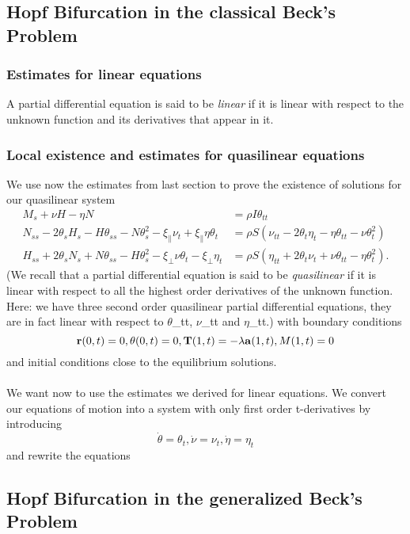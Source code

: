 
\subsection{Hopf Bifurcation in the classical Beck's Problem}
\subsubsection{Estimates for linear equations}
A partial differential equation is said to be \emph{linear} if it is linear with respect to the unknown function and its derivatives that appear in it.
\subsubsection{Local existence and estimates for quasilinear equations}
We use now the estimates from last section to prove the existence of solutions for our quasilinear system
\[
\begin{align}
M_s + \nu H -\eta N 
&= \rho I \theta_{tt}\\
N_{ss} - 2\theta_sH_s - H\theta_{ss}- N\theta_s^2 
- \xi_{\parallel}\nu_t + \xi_{\parallel}\eta\theta_t
&= \rho S (\nu_{tt} - 2 \theta_t\eta_t - \eta\theta_{tt} - \nu\theta_t^2)\\
H_{ss} + 2\theta_sN_s + N\theta_{ss} - H\theta_s^2 
- \xi_{\perp}\nu\theta_t - \xi_{\perp}\eta_t
&= \rho S (\eta_{tt} + 2\theta_t\nu_t + \nu\theta_{tt} - \eta\theta_t^2).
\end{align}
\]
(We recall that a partial differential equation is said to be \emph{quasilinear} if it is linear with respect to all the highest order derivatives of the unknown function. Here: we have three second order quasilinear partial differential equations, they are in fact linear with respect to $\theta$_{tt}, $\nu$_{tt} and $\eta$_{tt}.)
with boundary conditions
\[
\mathbf{r}(0,t)= 0,\\
\theta(0,t) = 0,\\
\mathbf{T}(1,t) = -\lambda \mathbf{a}(1,t),\\
M(1,t) = 0\\
\]
and initial conditions close to the equilibrium solutions.
\\\\
We want now to use the estimates we derived for linear equations. We convert our equations of motion into a system with only first order t-derivatives by introducing
\[
\dot\theta = \theta_t, \dot\nu = \nu_t, \dot\eta = \eta_t
\]
and rewrite the equations 
\[
\]




\subsection{Hopf Bifurcation in the generalized Beck's Problem}

